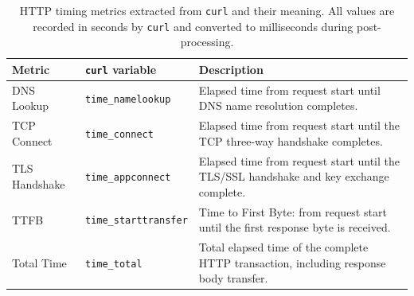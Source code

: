 \begin{table}[htbp]
  \centering
  \caption{HTTP timing metrics extracted from \texttt{curl} and their meaning.
    All values are recorded in seconds by \texttt{curl} and converted to
    milliseconds during post-processing.}
  \label{tab:bench_metrics}
  \small
  \begin{tabular}{llp{7.5cm}}
    \toprule
    \textbf{Metric} & \textbf{\texttt{curl} variable} & \textbf{Description} \\
    \midrule
    DNS Lookup & \texttt{time\_namelookup} & Elapsed time from request start until DNS name resolution completes. \\
    TCP Connect & \texttt{time\_connect} & Elapsed time from request start until the TCP three-way handshake completes. \\
    TLS Handshake & \texttt{time\_appconnect} & Elapsed time from request start until the TLS/SSL handshake and key exchange complete. \\
    TTFB & \texttt{time\_starttransfer} & Time to First Byte: from request start until the first response byte is received. \\
    Total Time & \texttt{time\_total} & Total elapsed time of the complete HTTP transaction, including response body transfer. \\
    \bottomrule
  \end{tabular}
\end{table}
